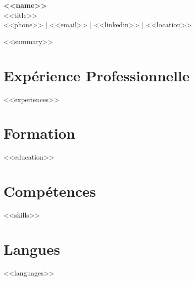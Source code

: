 \documentclass[11pt,a4paper]{article}
\begin{document}
\noindent\colorbox{header}{%
\parbox{\dimexpr\textwidth-2\fboxsep}{%
\vspace{8pt}
\centering
{\color{white}\LARGE\bfseries <<name>>}\\[3pt]
{\color{white!70}\small <<title>>}\\[3pt]
{\color{white!60}\footnotesize <<phone>> \enspace | \enspace <<email>> \enspace | \enspace <<linkedin>> \enspace | \enspace <<location>>}
\vspace{6pt}
}}

\vspace{8pt}

{\color{gray}\small <<summary>>}

\section{Exp\'erience Professionnelle}
<<experiences>>

\section{Formation}
<<education>>

\section{Comp\'etences}
<<skills>>

\section{Langues}
<<languages>>
\end{document}
